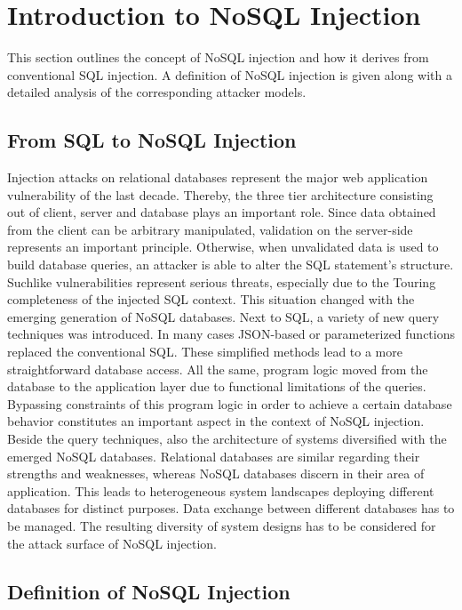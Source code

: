 \chapter{Introduction to NoSQL Injection}
This section outlines the concept of NoSQL injection and how it derives from conventional SQL injection. A definition of NoSQL injection is given along with a detailed analysis of the corresponding attacker models.

\section{From SQL to NoSQL Injection}
Injection attacks on relational databases represent the major web application vulnerability of the last decade. Thereby, the three tier architecture consisting out of client, server and database plays an important role. Since data obtained from the client can be arbitrary manipulated, validation on the server-side represents an important principle. Otherwise, when unvalidated data is used to build database queries, an attacker is able to alter the SQL statement's structure. Suchlike vulnerabilities represent serious threats, especially due to the Touring completeness of the injected SQL context. This situation changed with the emerging generation of NoSQL databases. Next to SQL, a variety of new query techniques was introduced. In many cases JSON-based or parameterized functions replaced the conventional SQL. These simplified methods lead to a more straightforward database access. All the same, program logic moved from the database to the application layer due to functional limitations of the queries. Bypassing constraints of this program logic in order to achieve a certain database behavior constitutes an important aspect in the context of NoSQL injection. Beside the query techniques, also the architecture of systems diversified with the emerged NoSQL databases. Relational databases are similar regarding their strengths and weaknesses, whereas NoSQL databases discern in their area of application. This leads to heterogeneous system landscapes deploying different databases for distinct purposes. Data exchange between different databases has to be managed. The resulting diversity of system designs has to be considered for the attack surface of NoSQL injection. 

\section{Definition of NoSQL Injection}


